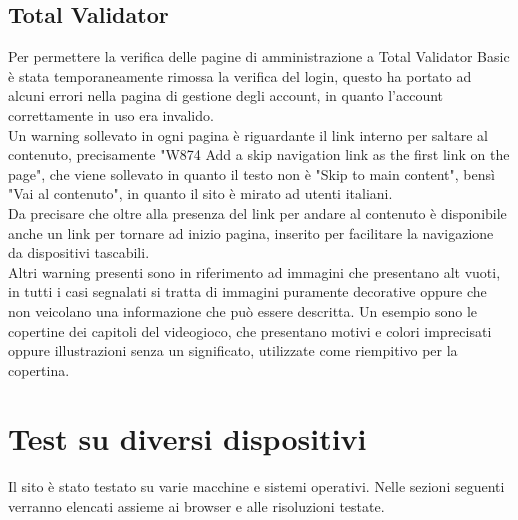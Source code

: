 \documentclass[openany, a4paper, 12pt]{report}
\begin{document}
			\subsection{Total Validator}
			Per permettere la verifica delle pagine di amministrazione a Total Validator Basic è stata temporaneamente rimossa la verifica del login, questo ha portato ad alcuni errori nella pagina di gestione degli account, in quanto l'account correttamente in uso era invalido.\\
			Un warning sollevato in ogni pagina è riguardante il link interno per saltare al contenuto, precisamente "W874 Add a skip navigation link as the first link on the page", che viene sollevato in quanto il testo non è "Skip to main content", bensì "Vai al contenuto", in quanto il sito è mirato ad utenti italiani.\\
			Da precisare che oltre alla presenza del link per andare al contenuto è disponibile anche un link per tornare ad inizio pagina, inserito per facilitare la navigazione da dispositivi tascabili.\\
			Altri warning presenti sono in riferimento ad immagini che presentano alt vuoti, in tutti i casi segnalati si tratta di immagini puramente decorative oppure che non veicolano una informazione che può essere descritta. Un esempio sono le copertine dei capitoli del videogioco, che presentano motivi e colori imprecisati oppure illustrazioni senza un  significato, utilizzate come riempitivo per la copertina.
			
		\section{Test su diversi dispositivi}
			Il sito è stato testato su varie macchine e sistemi operativi. Nelle sezioni seguenti verranno elencati assieme ai browser e alle risoluzioni testate.
\end{document}

